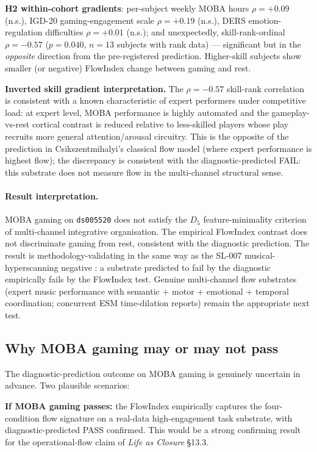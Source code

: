 \documentclass[11pt,a4paper]{article}
\begin{document}
\textbf{H2 within-cohort gradients}: per-subject weekly MOBA hours $\rho = +0.09$ (n.s.), IGD-20 gaming-engagement scale $\rho = +0.19$ (n.s.), DERS emotion-regulation difficulties $\rho = +0.01$ (n.s.); and unexpectedly, skill-rank-ordinal $\rho = -0.57$ ($p = 0.040$, $n = 13$ subjects with rank data) --- significant but in the \emph{opposite} direction from the pre-registered prediction. Higher-skill subjects show smaller (or negative) FlowIndex change between gaming and rest.

\textbf{Inverted skill gradient interpretation.} The $\rho = -0.57$ skill-rank correlation is consistent with a known characteristic of expert performers under competitive load: at expert level, MOBA performance is highly automated and the gameplay-vs-rest cortical contrast is reduced relative to less-skilled players whose play recruits more general attention/arousal circuitry. This is the opposite of the prediction in Csikszentmihalyi's classical flow model (where expert performance is highest flow); the discrepancy is consistent with the diagnostic-predicted FAIL: this substrate does not measure flow in the multi-channel structural sense.

\paragraph{Result interpretation.} MOBA gaming on \texttt{ds005520} does not satisfy the $D_5$ feature-minimality criterion of multi-channel integrative organisation. The empirical FlowIndex contrast does not discriminate gaming from rest, consistent with the diagnostic prediction. The result is methodology-validating in the same way as the SL-007 musical-hyperscanning negative \citep{SmartClosureDistance,SolutionLab007}: a substrate predicted to fail by the diagnostic empirically fails by the FlowIndex test. Genuine multi-channel flow substrates (expert music performance with semantic + motor + emotional + temporal coordination; concurrent ESM time-dilation reports) remain the appropriate next test.

\subsection{Why MOBA gaming may or may not pass}\label{sec:results-moba-discussion}

The diagnostic-prediction outcome on MOBA gaming is genuinely uncertain in advance. Two plausible scenarios:

\textbf{If MOBA gaming passes:} the FlowIndex empirically captures the four-condition flow signature on a real-data high-engagement task substrate, with diagnostic-predicted PASS confirmed. This would be a strong confirming result for the operational-flow claim of \emph{Life as Closure} \S 13.3.
\end{document}
